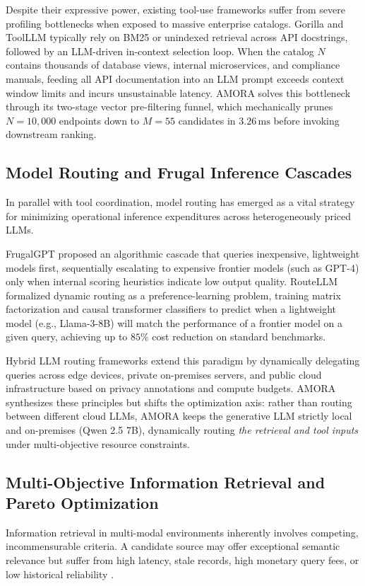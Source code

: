 \documentclass[journal,10pt,twocolumn]{IEEEtran}
\begin{document}
Despite their expressive power, existing tool-use frameworks suffer from severe profiling bottlenecks when exposed to massive enterprise catalogs. Gorilla and ToolLLM typically rely on BM25 or unindexed retrieval across API docstrings, followed by an LLM-driven in-context selection loop. When the catalog $N$ contains thousands of database views, internal microservices, and compliance manuals, feeding all API documentation into an LLM prompt exceeds context window limits and incurs unsustainable latency. AMORA solves this bottleneck through its two-stage vector pre-filtering funnel, which mechanically prunes $N=10,000$ endpoints down to $M=55$ candidates in $3.26\,\text{ms}$ before invoking downstream ranking.

\subsection{Model Routing and Frugal Inference Cascades}
In parallel with tool coordination, model routing has emerged as a vital strategy for minimizing operational inference expenditures across heterogeneously priced LLMs.

FrugalGPT \cite{chen2023frugalgpt} proposed an algorithmic cascade that queries inexpensive, lightweight models first, sequentially escalating to expensive frontier models (such as GPT-4) only when internal scoring heuristics indicate low output quality. RouteLLM \cite{ong2024routellm} formalized dynamic routing as a preference-learning problem, training matrix factorization and causal transformer classifiers to predict when a lightweight model (e.g., Llama-3-8B) will match the performance of a frontier model on a given query, achieving up to $85\%$ cost reduction on standard benchmarks.

Hybrid LLM routing frameworks \cite{ding2024hybrid} extend this paradigm by dynamically delegating queries across edge devices, private on-premises servers, and public cloud infrastructure based on privacy annotations and compute budgets. AMORA synthesizes these principles but shifts the optimization axis: rather than routing between different cloud LLMs, AMORA keeps the generative LLM strictly local and on-premises (Qwen 2.5 7B), dynamically routing \textit{the retrieval and tool inputs} under multi-objective resource constraints.

\subsection{Multi-Objective Information Retrieval and Pareto Optimization}
Information retrieval in multi-modal environments inherently involves competing, incommensurable criteria. A candidate source may offer exceptional semantic relevance but suffer from high latency, stale records, high monetary query fees, or low historical reliability \cite{miettinen1999multiobjective,deb2001multi}.
\end{document}
